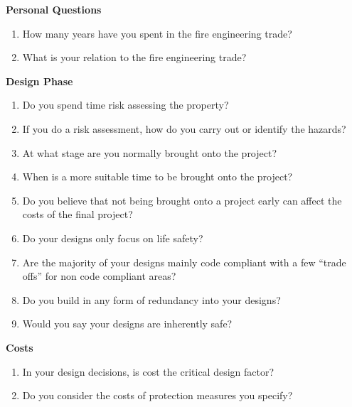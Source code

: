 \textbf{Personal Questions}
\begin{enumerate}
\item How many years have you spent in the fire engineering trade?
\item What is your relation to the fire engineering trade?
\end{enumerate}

\textbf{Design Phase}
\begin{enumerate}
\item Do you spend time risk assessing the property?
\item If you do a risk assessment, how do you carry out or identify the hazards?
\item At what stage are you normally brought onto the project?
\item When is a more suitable time to be brought onto the project?
\item Do you believe that not being brought onto a project early can affect the costs of the final project?
\item Do your designs only focus on life safety?
\item Are the majority of your designs mainly code compliant with a few ``trade offs'' for non code compliant areas?
\item Do you build in any form of redundancy into your designs?
\item Would you say your designs are inherently safe?
\end{enumerate}

\textbf{Costs}
\begin{enumerate}
\item In your design decisions, is cost the critical design factor?
\item Do you consider the costs of protection measures you specify?
\end{enumerate}

